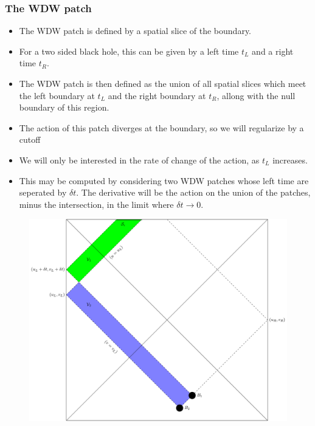 \documentclass[8pt,aspectratio=169]{beamer}
\begin{document}
\begin{frame}
\frametitle{The WDW patch}

\begin{minipage}[t]{0.5\linewidth}

\begin{itemize}

\item The WDW patch is defined by a spatial slice of the boundary. 

\item For a two sided black hole, this can be given by a left time $t_L$ and a right time $t_R$.

\item The WDW patch is then defined as the union of all spatial slices which meet the left boundary at $t_L$ and the right boundary at $t_R$, allong with the null boundary of this region.

\item The action of this patch diverges at the boundary, so we will regularize by a cutoff

\item We will only be interested in the rate of change of the action, as $t_L$ increases.

\item This may be computed by considering two WDW patches whose left time are seperated by $\delta t$. The derivative will be the action on the union of the patches, minus the intersection, in the limit where $\delta t \rightarrow 0$.

\end{itemize}

\end{minipage}\hfill
%
\begin{minipage}[t]{0.48\linewidth}

\begin{figure}
    \begin{center}
    
        \includegraphics[scale=0.35]{2WDW.pdf}    
    

\end{center}
\end{figure}
\end{minipage}
\end{frame}
\end{document}
